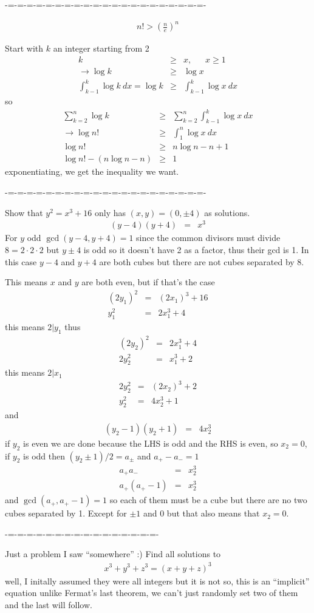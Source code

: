 \documentclass[aps,preprint,preprintnumbers,nofootinbib,showpacs,prd]{revtex4-1}
\newcommand{\nbea}{\begin{eqnarray*}}
\newcommand{\neea}{\end{eqnarray*}}
\begin{document}
-=-=-=-=-=-=-=-=-=-=-=-=-=-=-=-=-=-=-=-=-=-

%
\nbea
n! > \left(\frac{n}{e}\right)^n
\neea
%

Start with $k$ an integer starting from 2
%
\nbea
k & \ge & x, ~~~~~~~ x \ge 1 \\
\to \log k & \ge & \log x \\
\int_{k-1}^{k} \log k~ dx = \log k & \ge & \int_{k-1}^{k} \log x~ dx
\neea
%
so
%
\nbea
\sum_{k=2}^n \log k & \ge & \sum_{k=2}^n \int_{k-1}^{k} \log x~ dx \\
\to \log n! & \ge & \int_1^n \log x~dx \\
\log n! & \ge & n \log n - n + 1 \\
\log n! - (n\log n - n) & \ge & 1
\neea
%
exponentiating, we get the inequality we want.


-=-=-=-=-=-=-=-=-=-=-=-=-=-=-=-=-=-=-=-=-=-

Show that $y^2 = x^3 + 16$ only has $(x,y) = (0,\pm 4)$ as solutions.
%
\nbea
(y - 4)(y + 4) & = & x^3
\neea
%
For $y$ odd $\gcd(y-4,y+4) = 1$ since the common divisors must divide $8 = 2\cdot2\cdot2$ but $y \pm 4$ is odd so it doesn't have 2 as a factor, thus their gcd is 1. In this case $y-4$ and $y+4$ are both cubes but there are not cubes separated by 8.

This means $x$ and $y$ are both even, but if that's the case
%
\nbea
(2y_1)^2 & = & (2x_1)^3 + 16 \\
y_1^2 & = & 2x_1^3 + 4 
\neea
%
this means $2|y_1$ thus
%
\nbea
(2 y_2)^2 & = & 2x_1^3 + 4 \\
2y_2^2 & = & x_1^3 + 2
\neea
%
this means $2|x_1$
%
\nbea
2y_2^2 & = & (2x_2)^3 + 2 \\
y_2^2 & = & 4x_2^3 + 1
\neea
%
and
%
\nbea
(y_2 - 1)(y_2 + 1) & = & 4x_2^3
\neea
%
if $y_2$ is even we are done because the LHS is odd and the RHS is even, so $x_2 = 0$, if $y_2$ is odd then $(y_2\pm1)/2 = a_{\pm}$ and $a_+ - a_- = 1$
%
\nbea
a_+a_- & = & x_2^3 \\
a_+(a_+ - 1) & = & x_2^3
\neea
%
and $\gcd(a_+,a_+ - 1) = 1$ so each of them must be a cube but there are no two cubes separated by 1. Except for $\pm1$ and $0$ but that also means that $x_2 = 0$.

-=-=-=-=-=-=-=-=-=-=-=-=-=-=-=-=-

Just a problem I saw ``somewhere'' :) Find all solutions to
%
\nbea
x^3 + y^3 + z^3 = (x + y + z)^3
\neea
%
well, I initally assumed they were all integers but it is not so, this is an ``implicit'' equation unlike Fermat's last theorem, we can't just randomly set two of them and the last will follow.
\end{document}

